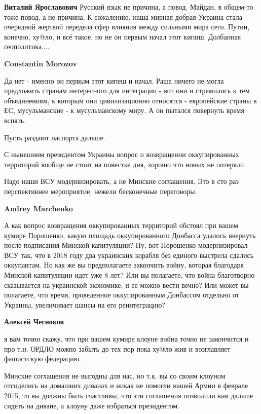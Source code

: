 \begin{itemize}
\begin{itemize}
\textbf{Виталий Ярославович} Русский язык не причина, а повод. Майдан, в общем-то тоже повод, а не причина. К сожалению, наша мирная добрая Украина стала очередной жертвой передела сфер влияния между сильными мира сего. Путин, конечно, ху@ло, и всё такое, но не он первым начал этот кипиш. Долбанная геополитика....

\textbf{Constantin Morozov} 

Да нет - именно он первым этот кипеш и начал. Раша ничего не могла предложить
странам интересного для интеграции - вот они и стремились к тем объединениям, к
которым они цивилизационно относятся - европейские страны в ЕС, мусульманские -
к мусульманскому миру. А он пытался повернуть время вспять.

\end{itemize} %

Пусть раздают паспорта дальше.

С нынешним президентом Украины вопрос о возвращении оккупированных территорий
вообще не стоит на повестке дня, хорошо что новых не потеряли.

Надо наши ВСУ модернизировать, а не Минские соглашения. Это в сто раз
перспективнее мероприятие, нежели бесконечные переговоры.

\begin{itemize} %
\textbf{Andrey Marchenko} 

А как вопрос возвращения оккупированных территорий обстоял при вашем кумире
Порошенко, какую площадь оккупированного Донбасса удалось ввернуть после
подписания Минской капитуляции? Ну, вот Порошенко модернизировал ВСУ так, что в
2018 году два украинских корабля без единого выстрела сдались оккупантам. Но
как же вы предполагаете закончить войну, которая благодаря Минской капитуляции
идет уже 8 лет? Или вы полагаете, что война благотворно сказывается на
украинской экономике, и ее можно вести вечно? Или может вы полагаете, что
время, проведенное оккупированным Донбассом отдельно от Украины, увеличивает
шансы на его реинтеграцию?

\textbf{Алексей Чесноков} 

я вам точно скажу, что при вашем кумире клоуне война точно не закончится и про
т.н. ОРДЛО можно забыть до тех пор пока ху@ло жив и возглавляет фашистскую
федерацию.

Минские соглашения не выгодны для нас, но т.к. вы со своим клоуном отсиделись
на домашних диванах и никак не помогли нашей Армии в феврале 2015, то вы должны
быть счастливы, что эти соглашения позволили вам дальше сидеть на диване, а
клоуну даже избраться президентом.


\end{itemize}
\end{itemize}

